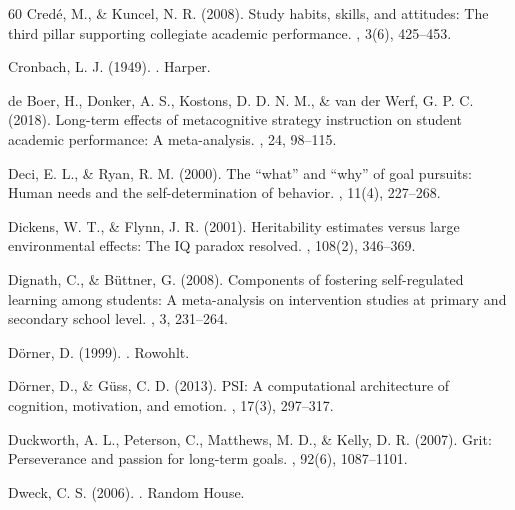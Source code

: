 \documentclass[12pt,a4paper]{article}
\begin{document}
\begin{thebibliography}{60}
Credé, M., \& Kuncel, N. R. (2008).
\newblock Study habits, skills, and attitudes: The third pillar supporting collegiate academic performance.
, 3(6), 425--453.

Cronbach, L. J. (1949).
.
\newblock Harper.

de Boer, H., Donker, A. S., Kostons, D. D. N. M., \& van der Werf, G. P. C. (2018).
\newblock Long-term effects of metacognitive strategy instruction on student academic performance: A meta-analysis.
, 24, 98--115.

Deci, E. L., \& Ryan, R. M. (2000).
\newblock The ``what'' and ``why'' of goal pursuits: Human needs and the self-determination of behavior.
, 11(4), 227--268.

Dickens, W. T., \& Flynn, J. R. (2001).
\newblock Heritability estimates versus large environmental effects: The IQ paradox resolved.
, 108(2), 346--369.

Dignath, C., \& B\"uttner, G. (2008).
\newblock Components of fostering self-regulated learning among students: A meta-analysis on intervention studies at primary and secondary school level.
, 3, 231--264.

Dörner, D. (1999).
.
\newblock Rowohlt.

Dörner, D., \& Güss, C. D. (2013).
\newblock PSI: A computational architecture of cognition, motivation, and emotion.
, 17(3), 297--317.

Duckworth, A. L., Peterson, C., Matthews, M. D., \& Kelly, D. R. (2007).
\newblock Grit: Perseverance and passion for long-term goals.
, 92(6), 1087--1101.

Dweck, C. S. (2006).
.
\newblock Random House.


\end{thebibliography}
\end{document}
